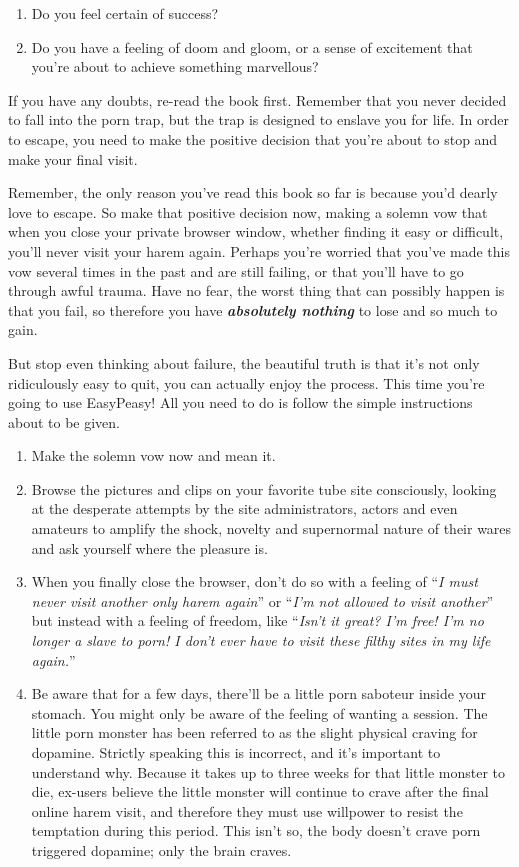 \documentclass[
]{book}
\begin{document}
\begin{enumerate}
\def\labelenumi{\arabic{enumi}.}
\item
  Do you feel certain of success?
\item
  Do you have a feeling of doom and gloom, or a sense of excitement that you're about to achieve something marvellous?
\end{enumerate}

If you have any doubts, re-read the book first. Remember that you never decided to fall into the porn trap, but the trap is designed to enslave you for life. In order to escape, you need to make the positive decision that you're about to stop and make your final visit.

Remember, the only reason you've read this book so far is because you'd dearly love to escape. So make that positive decision now, making a solemn vow that when you close your private browser window, whether finding it easy or difficult, you'll never visit your harem again. Perhaps you're worried that you've made this vow several times in the past and are still failing, or that you'll have to go through awful trauma. Have no fear, the worst thing that can possibly happen is that you fail, so therefore you have \textbf{\emph{absolutely nothing}} to lose and so much to gain.

But stop even thinking about failure, the beautiful truth is that it's not only ridiculously easy to quit, you can actually enjoy the process. This time you're going to use EasyPeasy! All you need to do is follow the simple instructions about to be given.

\begin{enumerate}
\def\labelenumi{\arabic{enumi}.}
\item
  Make the solemn vow now and mean it.
\item
  Browse the pictures and clips on your favorite tube site consciously, looking at the desperate attempts by the site administrators, actors and even amateurs to amplify the shock, novelty and supernormal nature of their wares and ask yourself where the pleasure is.
\item
  When you finally close the browser, don't do so with a feeling of ``\emph{I must never visit another only harem again}'' or ``\emph{I'm not allowed to visit another}'' but instead with a feeling of freedom, like ``\emph{Isn't it great? I'm free! I'm no longer a slave to porn! I don't ever have to visit these filthy sites in my life again.}''
\item
  Be aware that for a few days, there'll be a little porn saboteur inside your stomach. You might only be aware of the feeling of wanting a session. The little porn monster has been referred to as the slight physical craving for dopamine. Strictly speaking this is incorrect, and it's important to understand why. Because it takes up to three weeks for that little monster to die, ex-users believe the little monster will continue to crave after the final online harem visit, and therefore they must use willpower to resist the temptation during this period. This isn't so, the body doesn't crave porn triggered dopamine; only the brain craves.
\end{enumerate}
\end{document}
